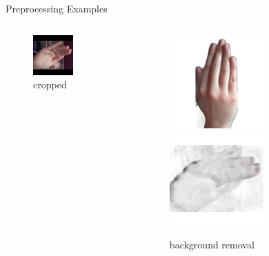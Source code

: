 \documentclass[aspectratio=169]{beamer}
\begin{document}
{\begin{frame}{Preprocessing Examples}
\begin{columns}[c]
\begin{column}{.33\textwidth}
\begin{figure}
        \includegraphics[width=0.6\textwidth]{img/cropped/nasmi_304.png}
        \caption{cropped}
    \end{figure}
    \end{column}
   
    \begin{column}{.33\textwidth}
    \begin{figure}
        \centering
        \includegraphics[width=0.6\textwidth]{img/rembg/nasmi_203.png}
        \includegraphics[width=0.6\textwidth]{img/rembg/nasmi_304.png}
        \caption{background removal}
    \end{figure}
    \end{column}
\end{columns}
\end{frame}

}
\end{document}

